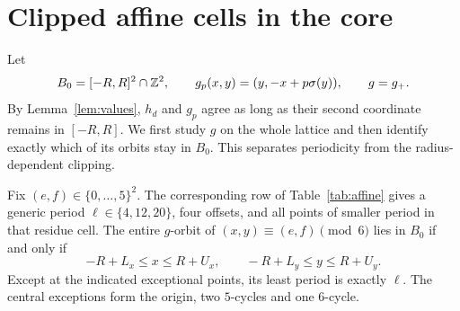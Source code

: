 \section{Clipped affine cells in the core}\label{sec:core}

Let
\[
 B_0=[-R,R]^2\cap\mathbb Z^2,\qquad
 g_p(x,y)=(y,-x+p\sigma(y)),\qquad g=g_+.
\]
By Lemma~\ref{lem:values}, $h_d$ and $g_p$ agree as long as their
second coordinate remains in $[-R,R]$. We first study $g$ on the
whole lattice and then identify exactly which of its orbits stay in
$B_0$. This separates periodicity from the radius-dependent clipping.

\begin{proposition}\label{prop:core}
Fix $(e,f)\in\{0,\ldots,5\}^2$. The corresponding row of
Table~\ref{tab:affine} gives a generic period
$\ell\in\{4,12,20\}$, four offsets, and all points of smaller period
in that residue cell. The entire $g$-orbit of $(x,y)\equiv(e,f)\pmod6$
lies in $B_0$ if and only if
\begin{equation}\label{eq:rectangle}
 -R+L_x\le x\le R+U_x,\qquad
 -R+L_y\le y\le R+U_y.
\end{equation}
Except at the indicated exceptional points, its least period is
exactly $\ell$. The central exceptions form the origin, two
$5$-cycles and one $6$-cycle.
\end{proposition}
